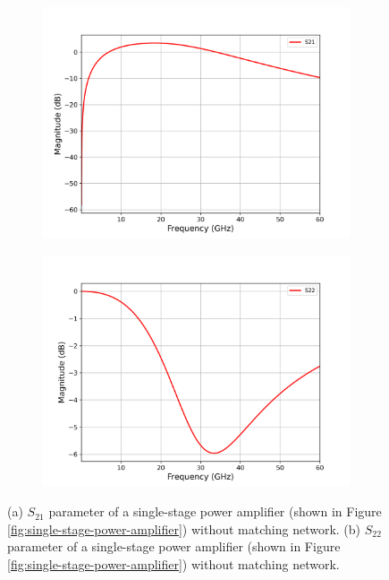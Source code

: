 \begin{figure}[H]
  \centering
  \begin{subfigure}{0.49\textwidth}
    \centering
    \includegraphics[width=\linewidth]{figures/single_stage_s21.png}
    \caption{}
    \label{fig:single-stage-without-cadence-s21}
  \end{subfigure}
  \hfill
  \begin{subfigure}{0.49\textwidth}
    \centering
    \includegraphics[width=\linewidth]{figures/single_stage_s22.png}
    \caption{}
     \label{fig:single-stage-without-cadence-s22}
  \end{subfigure}
  \caption{(a) $S_{21}$ parameter of a single-stage power amplifier (shown in Figure \ref{fig:single-stage-power-amplifier}) without matching network. (b) $S_{22}$ parameter of a single-stage power amplifier (shown in Figure \ref{fig:single-stage-power-amplifier}) without matching network.}
  \label{fig:single-stage-without-cadence-s21-s22}
\end{figure}

